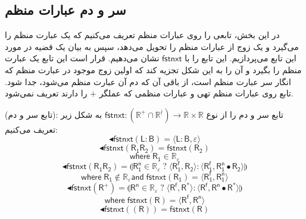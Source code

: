 \subsection{سر و دم عبارات منظم}
در این بخش، تابعی را روی عبارات منظم تعریف می‌کنیم که یک عبارت منظم را می‌گیرد و یک زوج از عبارات منظم را تحویل می‌دهد، سپس به بیان یک قضیه در مورد این تابع می‌پردازیم. این تابع را با
$\mathsf{fstnxt}$
نشان می‌دهیم. قرار است این تابع یک عبارت منظم را بگیرد و آن را به این شکل تجزیه کند که اولین زوج موجود در عبارت منظم که انگار سر عبارت منظم است، از باقی آن که دم آن عبارت منظم می‌شود، جدا شود. تابع روی عبارات منظم تهی و عبارات منظمی که عملگر $+$ را دارند تعریف نمی‌شود.
\begin{defn}
	(تابع سر و دم): تابع سر و دم را از نوع 
	$\mathsf{fstnxt}:\mathbb{( \mathbb{R^+ \cap R^\nmid})} \rightarrow \mathbb{R \times R}$ 
	به شکل زیر تعریف می‌‌کنیم:
	$$
	\blacktriangleleft\mathsf{fstnxt (L:B) = \langle L:B , \varepsilon \rangle }
	$$
	$$
	\blacktriangleleft\mathsf{fstnxt (R_1 R_2) = fstnxt (R_2)}$$
	$$\mathsf{where\; R_1 \in \mathbb{R}_\varepsilon}$$
	$$\blacktriangleleft\mathsf{fstnxt(R_1 R_2)= \llparenthesis  R_1^n \in \mathbb{R}_\varepsilon \; \mathbb{?} \; \langle R_1^f , R_2 \rangle : 
		\langle R_1^f , R_1^n \bullet R_{2} \rangle \rrparenthesis} $$
	$$\mathsf{where\; R_1 \notin \mathbb{R}_\varepsilon and\;
		fstnxt(R_1)= \langle R_1^f , R_1^n \rangle}$$
	$$\blacktriangleleft\mathsf{fstnxt(R^+)= \llparenthesis R^n \in \mathbb{R_\varepsilon}\;?\;\langle R^f , R^* \rangle : \langle R^f , R^n \bullet R^* \rangle \rrparenthesis}$$
	$$\mathsf{where\; fstnxt(R)=\langle R^f , R^n \rangle}$$
	$$\blacktriangleleft\mathsf{fstnxt((R))=fstnxt(R)}$$
	
\end{defn}

